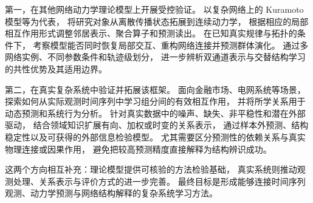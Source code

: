 第一，在其他网络动力学理论模型上开展受控验证。
以复杂网络上的 Kuramoto 模型等为代表，
将研究对象从离散传播状态拓展到连续动力学，
根据相应的局部相互作用形式调整邻居表示、聚合算子和预测读出。
在已知真实规律与拓扑的条件下，
考察模型能否同时恢复局部交互、重构网络连接并预测群体演化。
通过多网络实例、不同参数条件和轨迹级划分，
进一步辨析双通道表示与交替结构学习的共性优势及其适用边界。

第二，在真实复杂系统中验证并拓展该框架。
面向金融市场、电网系统等场景，
探索如何从实际观测时间序列中学习组分间的有效相互作用，
并将所学关系用于动态预测和系统行为分析。
针对真实数据中的噪声、缺失、非平稳性和潜在外部驱动，
结合领域知识扩展有向、加权或时变的关系表示，
通过样本外预测、结构稳定性以及可获得的外部信息检验模型。
尤其需要区分预测性的依赖关系与真实物理连接或因果作用，
避免把较高预测精度直接解释为结构辨识成功。

这两个方向相互补充：理论模型提供可核验的方法检验基础，
真实系统则推动观测处理、关系表示与评价方式的进一步完善。
最终目标是形成能够连接时间序列观测、动力学预测与网络结构解释的复杂系统学习方法。
